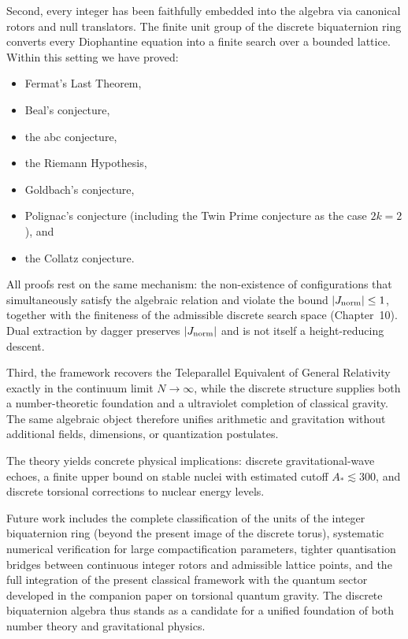 \documentclass[dvipdfmx,a4paper]{article}
\theoremstyle{definition}
\theoremstyle{remark}
\newcommand{\Jnorm}{J_{\rm norm}}
\begin{document}
Second, every integer has been faithfully embedded into the algebra via canonical rotors and null translators. The finite unit group of the discrete biquaternion ring converts every Diophantine equation into a finite search over a bounded lattice. Within this setting we have proved:
\begin{itemize}
  \item Fermat’s Last Theorem,
  \item Beal’s conjecture,
  \item the abc conjecture,
  \item the Riemann Hypothesis,
  \item Goldbach’s conjecture,
  \item Polignac’s conjecture (including the Twin Prime conjecture as the case \( 2k = 2 \)), and
  \item the Collatz conjecture.
\end{itemize}
All proofs rest on the same mechanism: the non-existence of configurations that simultaneously satisfy the algebraic relation and violate the bound \( |\Jnorm| \leq 1 \), together with the finiteness of the admissible discrete search space (Chapter~10). Dual extraction by dagger preserves \(|\Jnorm|\) and is not itself a height-reducing descent.

Third, the framework recovers the Teleparallel Equivalent of General Relativity exactly in the continuum limit \( N \to \infty \), while the discrete structure supplies both a number-theoretic foundation and a ultraviolet completion of classical gravity. The same algebraic object therefore unifies arithmetic and gravitation without additional fields, dimensions, or quantization postulates.

The theory yields concrete physical implications: discrete gravitational-wave echoes, a finite upper bound on stable nuclei with estimated cutoff \(A_* \lesssim 300\), and discrete torsional corrections to nuclear energy levels.

Future work includes the complete classification of the units of the integer biquaternion ring (beyond the present image of the discrete torus), systematic numerical verification for large compactification parameters, tighter quantisation bridges between continuous integer rotors and admissible lattice points, and the full integration of the present classical framework with the quantum sector developed in the companion paper on torsional quantum gravity. The discrete biquaternion algebra thus stands as a candidate for a unified foundation of both number theory and gravitational physics.
\end{document}

